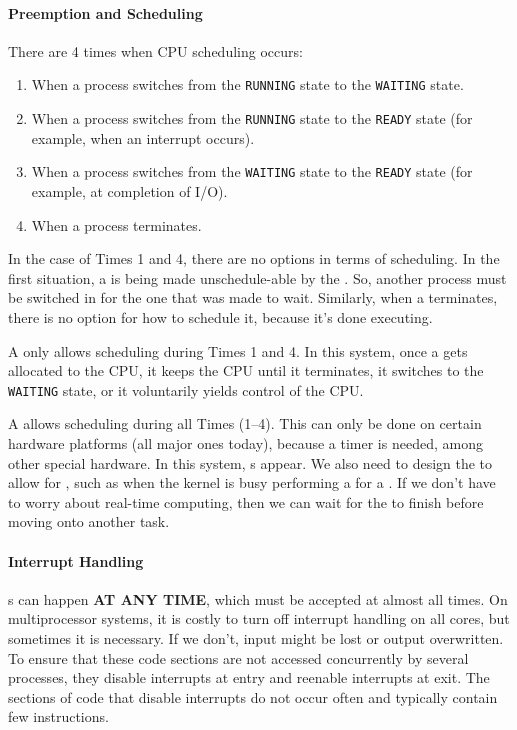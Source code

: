 \paragraph{Preemption and Scheduling}\label{par:Preemption_Scheduling}
There are 4 times when CPU scheduling occurs:
\begin{enumerate}[noitemsep]
\item When a process switches from the \texttt{RUNNING} state to the \texttt{WAITING} state.
\item When a process switches from the \texttt{RUNNING} state to the \texttt{READY} state (for example, when an interrupt occurs).
\item When a process switches from the \texttt{WAITING} state to the \texttt{READY} state (for example, at completion of I/O).
\item When a process terminates.
\end{enumerate}

In the case of Times 1 and 4, there are no options in terms of scheduling.
In the first situation, a  is being made unschedule-able by the .
So, another process must be switched in for the one that was made to wait.
Similarly, when a  terminates, there is no option for how to schedule it, because it's done executing.

A  only allows scheduling during Times 1 and 4.
In this system, once a  gets allocated to the CPU, it keeps the CPU until it terminates, it switches to the \texttt{WAITING} state, or it voluntarily yields control of the CPU.

A  allows scheduling during all Times (1--4).
This can only be done on certain hardware platforms (all major ones today), because a timer is needed, among other special hardware.
In this system, s appear.
We also need to design the  to allow for , such as when the kernel is busy performing a  for a .
If we don't have to worry about real-time computing, then we can wait for the  to finish before moving onto another task.

\paragraph{Interrupt Handling}\label{par:Interrupt_Handling}
s can happen \textbf{AT ANY TIME}, which must be accepted at almost all times.
On multiprocessor systems, it is costly to turn off interrupt handling on all cores, but sometimes it is necessary.
If we don't, input might be lost or output overwritten.
To ensure that these code sections are not accessed concurrently by several processes, they disable interrupts at entry and reenable interrupts at exit.
The sections of code that disable interrupts do not occur often and typically contain few instructions.

